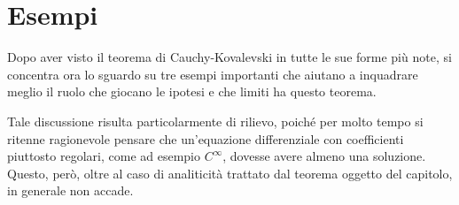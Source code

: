 \section{Esempi}
Dopo aver visto il teorema di Cauchy-Kovalevski in tutte le sue forme più note, si concentra ora lo sguardo su tre esempi importanti  che aiutano a inquadrare meglio il ruolo che giocano le ipotesi e che limiti ha questo teorema.

Tale discussione risulta particolarmente di rilievo, poiché per molto tempo si ritenne ragionevole pensare che un'equazione differenziale con coefficienti piuttosto regolari, come ad esempio $C^\infty$, dovesse avere almeno una soluzione. Questo, però, oltre al caso di analiticità trattato dal teorema oggetto del capitolo, in generale non accade.

\setcounter{example}{0}

